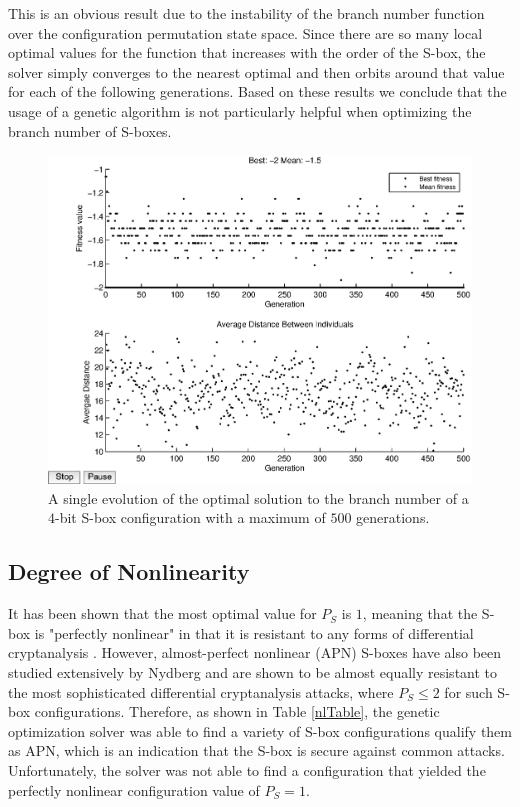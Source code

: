 \documentclass[11pt]{article}
\begin{document}
This is an obvious result due to the instability of the branch number function over the configuration permutation state space. Since there are so many local optimal values for the function that increases with the order of the S-box, the solver simply converges to the nearest optimal and then orbits around that value for each of the following generations. Based on these results we conclude that the usage of a genetic algorithm is not particularly helpful when optimizing the branch number of S-boxes.

\begin{figure}[!ht]
	\centering
	\includegraphics[scale=0.5]{images/bn_results16.eps} 

\caption{A single evolution of the optimal solution to the branch number of a $4$-bit S-box configuration with a maximum of $500$ generations.}
	\label{bn16}
\end{figure}

\subsection{Degree of Nonlinearity}
It has been shown that the most optimal value for $P_S$ is $1$, meaning that the S-box is "perfectly nonlinear" in that it is resistant to any forms of differential cryptanalysis \cite{ProvableSecurity}. However, almost-perfect nonlinear (APN) S-boxes have also been studied extensively by Nydberg and are shown to be almost equally resistant to the most sophisticated differential cryptanalysis attacks, where $P_S \leq 2$ for such S-box configurations. Therefore, as shown in Table \ref{nlTable}, the genetic optimization solver was able to find a variety of S-box configurations qualify them as APN, which is an indication that the S-box is secure against common attacks. Unfortunately, the solver was not able to find a configuration that yielded the perfectly nonlinear configuration value of $P_S = 1$. 
\end{document}
